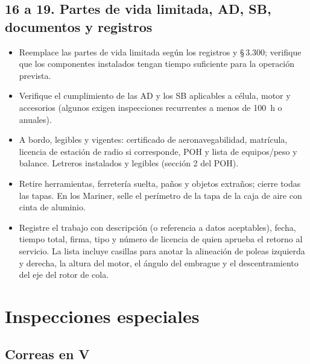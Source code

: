 \subsection*{16 a 19. Partes de vida limitada, AD, SB, documentos y registros}
\begin{itemize}
\item Reemplace las partes de vida limitada según los registros y \S\,3.300; verifique que los componentes instalados tengan tiempo suficiente para la operación prevista.
\item Verifique el cumplimiento de las AD y los SB aplicables a célula, motor y accesorios (algunos exigen inspecciones recurrentes a menos de 100~h o anuales).
\item A bordo, legibles y vigentes: certificado de aeronavegabilidad, matrícula, licencia de estación de radio si corresponde, POH y lista de equipos/peso y balance. Letreros instalados y legibles (sección 2 del POH).
\item Retire herramientas, ferretería suelta, paños y objetos extraños; cierre todas las tapas. En los Mariner, selle el perímetro de la tapa de la caja de aire con cinta de aluminio.
\item Registre el trabajo con descripción (o referencia a datos aceptables), fecha, tiempo total, firma, tipo y número de licencia de quien aprueba el retorno al servicio. La lista incluye casillas para anotar la alineación de poleas izquierda y derecha, la altura del motor, el ángulo del embrague y el descentramiento del eje del rotor de cola.
\end{itemize}

\section{Inspecciones especiales}

\subsection{Correas en V}

